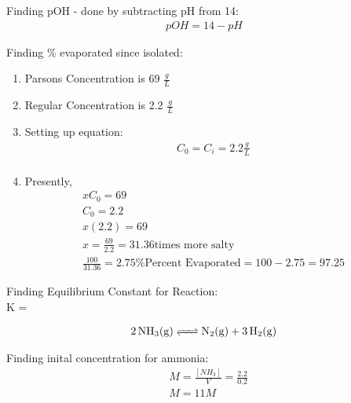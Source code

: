 \documentclass{article}  %
\begin{document}
Finding pOH - done by subtracting pH from 14:
\begin{equation*}
    \begin{aligned}
        pOH = 14 - pH
    \end{aligned}
\end{equation*} 

Finding \% evaporated since isolated:
\begin{enumerate}
    \item Parsons Concentration is 69 $\frac{g}{L}$
    \item Regular Concentration is 2.2 $\frac{g}{L}$
    \item Setting up equation:
    \begin{equation*}
        \begin{aligned}
            C_0 = C_i = 2.2 \frac{g}{L} \\
        \end{aligned}
    \end{equation*}
    \item Presently, 
    \begin{equation*}
        \begin{aligned}
            xC_0 = 69 \\
            C_0 = 2.2 \\
            x(2.2) = 69 \\
            x = \frac{69}{2.2}  = 31.36 \text{times more salty}\\
            \frac{100}{31.36} = 2.75\% 
            \text{Percent Evaporated} = 100 - 2.75 = 97.25
        \end{aligned}
    \end{equation*}
\end{enumerate}

Finding Equilibrium Constant for Reaction: \\
K = 

\begin{equation*}
    \begin{aligned}
        \ce{2NH3_(g) <=> N2_(g) + 3H2_(g)}
    \end{aligned}
\end{equation*}

Finding inital concentration for ammonia:
\begin{equation*}
    \begin{aligned}
        &M = \frac{[NH_3]}{V} = \frac{2.2}{0.2} \\
        &M = 11M
    \end{aligned}
\end{equation*}
\end{document}
